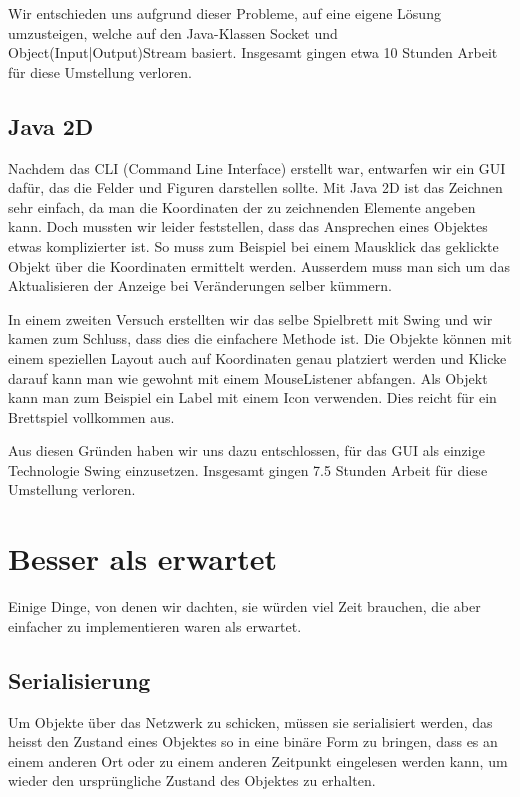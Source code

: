 \documentclass[12pt,halfparskip]{scrartcl}
\begin{document}
Wir entschieden uns aufgrund dieser Probleme, auf eine eigene Lösung umzusteigen, welche auf den Java-Klassen Socket und Object(Input|Output)Stream basiert. Insgesamt gingen etwa 10 Stunden Arbeit für diese Umstellung verloren.

\subsection{Java 2D}
\label{java_2d}

Nachdem das CLI (Command Line Interface) erstellt war, entwarfen wir ein GUI dafür, das die Felder und Figuren darstellen sollte. Mit Java 2D ist das Zeichnen sehr einfach, da man die Koordinaten der zu zeichnenden Elemente angeben kann. Doch mussten wir leider feststellen, dass das Ansprechen eines Objektes etwas komplizierter ist. So muss zum Beispiel bei einem Mausklick das geklickte Objekt über die Koordinaten ermittelt werden. Ausserdem muss man sich um das Aktualisieren der Anzeige bei Veränderungen selber kümmern.

In einem zweiten Versuch erstellten wir das selbe Spielbrett mit Swing und wir kamen zum Schluss, dass dies die einfachere Methode ist. Die Objekte können mit einem speziellen Layout auch auf Koordinaten genau platziert werden und Klicke darauf kann man wie gewohnt mit einem MouseListener abfangen. Als Objekt kann man zum Beispiel ein Label mit einem Icon verwenden. Dies reicht für ein Brettspiel vollkommen aus.

Aus diesen Gründen haben wir uns dazu entschlossen, für das GUI als einzige Technologie Swing einzusetzen. Insgesamt gingen 7.5 Stunden Arbeit für diese Umstellung verloren.

\clearpage
\section{Besser als erwartet}

Einige Dinge, von denen wir dachten, sie würden viel Zeit brauchen, die aber einfacher zu implementieren waren als erwartet.

\subsection{Serialisierung}

Um Objekte über das Netzwerk zu schicken, müssen sie serialisiert werden, das heisst den Zustand eines Objektes so in eine binäre Form zu bringen, dass es an einem anderen Ort oder zu einem anderen Zeitpunkt eingelesen werden kann, um wieder den ursprüngliche Zustand des Objektes zu erhalten.
\end{document}
